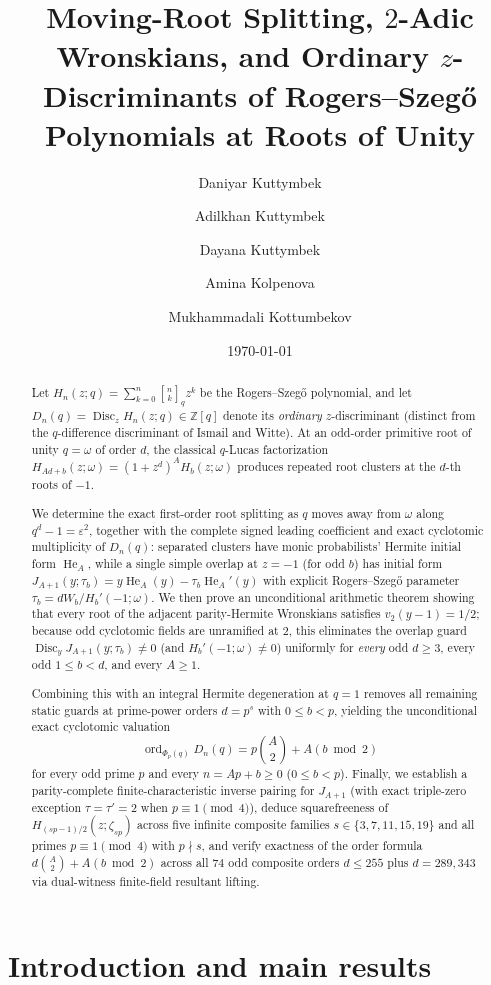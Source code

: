 \documentclass[11pt,reqno]{amsart}
\title[Ordinary Discriminants of Rogers--Szeg\H{o} Polynomials]{Moving-Root Splitting, $2$-Adic Wronskians, and Ordinary $z$-Discriminants of Rogers--Szeg\H{o} Polynomials at Roots of Unity}
\author[D. Kuttymbek]{Daniyar Kuttymbek}
\author[A. Kuttymbek]{Adilkhan Kuttymbek}
\author[D. Kuttymbek]{Dayana Kuttymbek}
\author[A. Kolpenova]{Amina Kolpenova}
\author[M. Kottumbekov]{Mukhammadali Kottumbekov}
\date{\today}
\numberwithin{equation}{section}
\theoremstyle{definition}
\theoremstyle{remark}
\newcommand{\Z}{\mathbb{Z}}
\newcommand{\He}{\operatorname{He}}
\newcommand{\Disc}{\operatorname{Disc}}
\newcommand{\ord}{\operatorname{ord}}
\newcommand{\eps}{\varepsilon}
\newcommand{\qbin}[2]{\genfrac{[}{]}{0pt}{}{#1}{#2}_q}
\begin{document}
\begin{abstract}
Let $H_n(z;q)=\sum_{k=0}^n \qbin{n}{k} z^k$ be the Rogers--Szeg\H{o} polynomial, and let $D_n(q)=\Disc_z H_n(z;q)\in\Z[q]$ denote its \emph{ordinary} $z$-discriminant (distinct from the $q$-difference discriminant of Ismail and Witte). At an odd-order primitive root of unity $q=\omega$ of order $d$, the classical $q$-Lucas factorization $H_{Ad+b}(z;\omega)=(1+z^d)^A H_b(z;\omega)$ produces repeated root clusters at the $d$-th roots of $-1$.

We determine the exact first-order root splitting as $q$ moves away from $\omega$ along $q^d-1=\eps^2$, together with the complete signed leading coefficient and exact cyclotomic multiplicity of $D_n(q)$: separated clusters have monic probabilists' Hermite initial form $\He_A$, while a single simple overlap at $z=-1$ (for odd $b$) has initial form $J_{A+1}(y;\tau_b)=y\He_A(y)-\tau_b\He_A'(y)$ with explicit Rogers--Szeg\H{o} parameter $\tau_b=dW_b/H_b'(-1;\omega)$. We then prove an unconditional arithmetic theorem showing that every root of the adjacent parity-Hermite Wronskians satisfies $v_2(y-1)=1/2$; because odd cyclotomic fields are unramified at $2$, this eliminates the overlap guard $\Disc_y J_{A+1}(y;\tau_b)\neq 0$ (and $H_b'(-1;\omega)\neq 0$) uniformly for \emph{every} odd $d\ge 3$, every odd $1\le b<d$, and every $A\ge 1$.

Combining this with an integral Hermite degeneration at $q=1$ removes all remaining static guards at prime-power orders $d=p^s$ with $0\le b<p$, yielding the unconditional exact cyclotomic valuation
\[
\ord_{\Phi_p(q)} D_n(q) = p\binom{A}{2} + A(b\bmod 2)
\]
for every odd prime $p$ and every $n=Ap+b\ge 0$ ($0\le b<p$). Finally, we establish a parity-complete finite-characteristic inverse pairing for $J_{A+1}$ (with exact triple-zero exception $\tau=\tau'=2$ when $p\equiv 1\pmod 4$), deduce squarefreeness of $H_{(sp-1)/2}(z;\zeta_{sp})$ across five infinite composite families $s\in\{3,7,11,15,19\}$ and all primes $p\equiv 1\pmod 4$ with $p\nmid s$, and verify exactness of the order formula $d\binom{A}{2}+A(b\bmod 2)$ across all $74$ odd composite orders $d\le 255$ plus $d=289,343$ via dual-witness finite-field resultant lifting.
\end{abstract}

\maketitle

\section{Introduction and main results}
\label{sec:intro}
\end{document}
